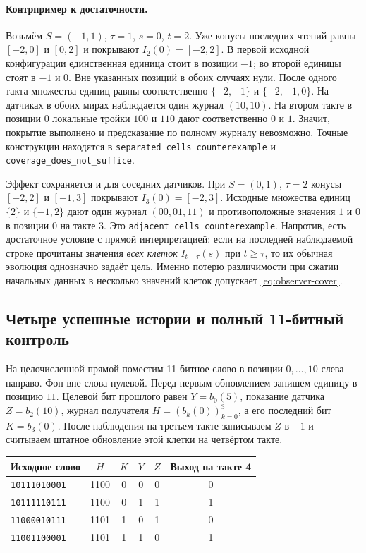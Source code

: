 \paragraph{Контрпример к достаточности.}
Возьмём $S=(-1,1)$, $\tau=1$, $s=0$, $t=2$. Уже конусы последних чтений
равны $[-2,0]$ и $[0,2]$ и покрывают $I_2(0)=[-2,2]$.
В первой исходной конфигурации единственная единица стоит в позиции $-1$;
во второй единицы стоят в $-1$ и $0$. Вне указанных позиций в обоих случаях
нули. После одного такта множества единиц равны соответственно
$\{-2,-1\}$ и $\{-2,-1,0\}$. На датчиках в обоих мирах наблюдается один
журнал $(10,10)$. На втором такте в позиции $0$ локальные тройки $100$ и
$110$ дают соответственно $0$ и $1$. Значит, покрытие выполнено и
предсказание по полному журналу невозможно. Точные конструкции находятся в
\texttt{separated\_cells\_counterexample} и \texttt{coverage\_does\_not\_suffice}.

Эффект сохраняется и для соседних датчиков. При $S=(0,1)$, $\tau=2$ конусы
$[-2,2]$ и $[-1,3]$ покрывают $I_3(0)=[-2,3]$. Исходные множества единиц
$\{2\}$ и $\{-1,2\}$ дают один журнал $(00,01,11)$ и противоположные
значения $1$ и $0$ в позиции $0$ на такте $3$. Это
\texttt{adjacent\_cells\_counterexample}. Напротив, есть достаточное условие
с прямой интерпретацией: если на последней наблюдаемой строке прочитаны
значения \emph{всех клеток} $I_{t-\tau}(s)$ при $t\ge\tau$, то их обычная
эволюция однозначно задаёт цель. Именно потерю различимости при сжатии
начальных данных в несколько значений клеток допускает
\eqref{eq:observer-cover}.

\subsection{Четыре успешные истории и полный 11-битный контроль}

На целочисленной прямой поместим 11-битное слово в позиции $0,\ldots,10$
слева направо. Фон вне слова нулевой. Перед первым обновлением запишем
единицу в позицию $11$. Целевой бит прошлого равен $Y=b_0(5)$, показание
датчика $Z=b_2(10)$, журнал получателя $H=(b_k(0))_{k=0}^3$, а его последний
бит $K=b_3(0)$. После наблюдения на третьем такте записываем $Z$ в $-1$ и
считываем штатное обновление этой клетки на четвёртом такте.

\begin{center}
\begin{tabular}{lccccc}
Исходное слово & $H$ & $K$ & $Y$ & $Z$ & Выход на такте 4 \\
\hline
\texttt{10111010001} & 1100 & 0 & 0 & 0 & 0 \\
\texttt{10111110111} & 1100 & 0 & 1 & 1 & 1 \\
\texttt{11000010111} & 1101 & 1 & 0 & 1 & 0 \\
\texttt{11001100001} & 1101 & 1 & 1 & 0 & 1
\end{tabular}
\end{center}

